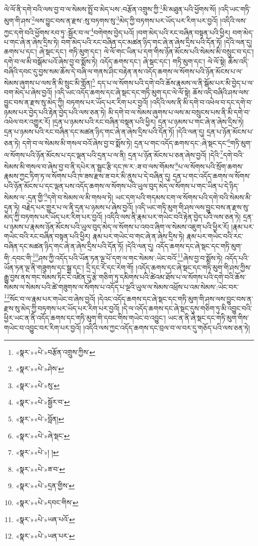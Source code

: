 ལེ་ལོ་ནི་དགེ་བའི་ལས་བྱ་བ་ལ་སེམས་སྤྲོ་བ་མེད་པས་:བརྩོན་འགྲུས་ཀྱི་\footnote{«སྣར་»«པེ་»བརྩོན་འགྲུས་ཀྱིས་}མི་མཐུན་པའི་ཕྱོགས་སོ། །འདི་ཡང་གཏི་མུག་གི་ཤས་\footnote{«སྣར་»«པེ་»ཤེས་}ལས་བྱུང་བས་ན་རྫས་:སུ་བཏགས་སུ་\footnote{«སྣར་»«པེ་»སུ་}མེད་ཀྱི་བཏགས་པར་ཡོད་པར་རིག་པར་བྱའོ། །འདིའི་ལས་ཀྱང་དགེ་བའི་ཕྱོགས་རབ་ཏུ་:སྦྱོར་བ་ལ་\footnote{«སྣར་»«པེ་»སྦྱོར་བ་}བགེགས་བྱེད་པའོ། །བག་མེད་པའི་རང་བཞིན་བསྟན་པའི་ཕྱིར། བག་མེད་པ་གང་ཞེ་ན་ཞེས་དྲིས་ཏེ། བག་མེད་པའི་རང་བཞིན་དང་མཚན་ཉིད་གང་ཞེ་ན་ཞེས་དྲིས་པའི་དོན་ཏོ། །དེའི་ལན་དུ། ཆགས་པ་དང་། ཞེ་སྡང་དང་། གཏི་མུག་དང་། ལེ་ལོ་གང་ཡིན་པ་དག་གིས་ཉོན་མོངས་པའི་སེམས་མི་བསྲུང་བ་དང་། དགེ་བ་ལ་མི་བསྒོམ་པའོ་ཞེས་བྱ་བ་སྨོས་ཏེ། འདོད་ཆགས་དང་། ཞེ་སྡང་དང་། གཏི་མུག་དང་། ལེ་ལོ་སྟེ། ཆོས་འདི་བཞིའི་དབང་དུ་བྱས་སམ་ཆོས་དེ་བཞི་ལ་གནས་ཤིང་བརྟེན་ནས་འདོད་ཆགས་ལ་སོགས་པའི་ཉོན་མོངས་པ་ལ་སེམས་ཞུགས་པ་ལས་ནི་མི་སྲུང་མི་གློན།\footnote{«སྣར་»«པེ་»བློན།} དད་པ་ལ་སོགས་པའི་དགེ་བའི་ཆོས་རྣམས་ལ་ནི་སྒོམ་པར་མི་བྱེད་པ་ལ་བག་མེད་པ་ཞེས་བྱའོ། །འདི་ཡང་འདོད་ཆགས་དང་ཞེ་སྡང་དང་གཏི་མུག་དང་ལེ་ལོ་སྟེ། ཆོས་འདི་བཞིའི་ཤས་ལས་བྱུང་བས་ན་རྫས་སུ་མེད་ཀྱི། བཏགས་པར་ཡོད་པར་རིག་པར་བྱའོ། །འདིའི་ལས་ནི་མི་དགེ་བ་འཕེལ་བ་དང་དགེ་བ་ཉམས་པར་བྱེད་པའི་རྟེན་བྱེད་པའི་ལས་ཅན་ཏེ། མི་དགེ་བ་ལ་སེམས་ཞུགས་པ་ལས་མ་བསྲུངས་པས་ནི་མི་དགེ་བ་འཕེལ་བར་འགྱུར་རོ། །དྲན་པ་ཉམས་པའི་རང་བཞིན་བསྟན་པའི་ཕྱིར། དྲན་པ་ཉམས་པ་གང་ཞེ་ན་ཞེས་དྲིས་ཏེ། དྲན་པ་ཉམས་པའི་རང་བཞིན་དང་མཚན་ཉིད་གང་ཞེ་ན་ཞེས་དྲིས་པའི་དོན་ཏོ། །དེའི་ལན་དུ། དྲན་པ་ཉོན་མོངས་པ་ཅན་ཏེ། དགེ་བ་ལ་སེམས་མི་གསལ་བའོ་ཞེས་བྱ་བ་སྨོས་ཏེ། དྲན་པ་གང་འདོད་ཆགས་དང་:ཞེ་སྡང་དང་\footnote{«སྣར་»«པེ་»ཞེ་སྡང་}གཏི་མུག་ལ་སོགས་པའི་ཉོན་མོངས་པ་དང་ལྡན་པའི་དྲན་པ་ལ་ནི། དྲན་པ་ཉོན་མོངས་པ་ཅན་ཞེས་བྱའོ། །དེའི་\footnote{«སྣར་»«པེ་»། །}དགེ་བའི་སེམས་མི་གསལ་བ་ཞེས་བྱ་བ་ནི་དཔེར་ན་སྦྲང་རྩི་དང་ཁ་ར་:ཟ་བ་ལས་གོམས་\footnote{«སྣར་»«པེ་»ཟ་བ་}པ་ལ་སོགས་པའི་སྲོག་ཆགས་རྣམས་ཀྱང་ཏིག་ཏ་ལ་སོགས་པའི་ཁ་ཟས་རྫས་ཟ་བར་མི་ནུས་པ་དེ་བཞིན་དུ། དྲན་པ་གང་འདོད་ཆགས་ལ་སོགས་པའི་ཉོན་མོངས་པ་དང་ལྡན་པས་འདོད་ཆགས་ལ་སོགས་པའི་ཡུལ་བུད་མེད་ལ་སོགས་པ་གང་ཡིན་པ་དེ་ཉིད་སེམས་ལ་:དྲན་གྱི་\footnote{«སྣར་»«པེ་»དྲན་གྱིས་}དགེ་བ་སེམས་ལ་མི་གསལ་ཏེ། ཡང་དག་པའི་གདམས་ངག་ལ་སོགས་པའི་དགེ་བའི་སེམས་མི་དྲན་ཏེ། བརྗེད་པར་གྱུར་པ་ལ་ནི་དྲན་པ་ཉམས་པ་ཞེས་བྱའོ། །འདི་ཡང་གཏི་མུག་གི་ཤས་ལས་བྱུང་བས་ན་རྫས་སུ་མེད་ཀྱི་བཏགས་པར་ཡོད་པར་རིག་པར་བྱའོ། །འདིའི་ལས་ནི་རྣམ་པར་གཡེང་བའི་རྟེན་བྱེད་པའི་ལས་ཅན་ཏེ། དྲན་པ་ཉམས་པ་རྣམས་ཉོན་མོངས་པའི་ཡུལ་བུད་མེད་ལ་སོགས་པ་འབའ་ཞིག་ལ་སེམས་འཇུག་པའི་ཕྱིར་རོ། །རྣམ་པར་གཡེང་བའི་རང་བཞིན་བསྟན་པའི་ཕྱིར། རྣམ་པར་གཡེང་བ་གང་ཞེ་ན་ཞེས་དྲིས་ཏེ། རྣམ་པར་གཡེང་བའི་རང་བཞིན་དང་མཚན་ཉིད་གང་ཞེ་ན་ཞེས་དྲིས་པའི་དོན་ཏོ། །དེའི་ལན་དུ། འདོད་ཆགས་དང་ཞེ་སྡང་དང་གཏི་མུག་གི་:དབང་གི་\footnote{«སྣར་»«པེ་»དབང་གིས་}ཤས་ཀྱི་འདོད་པའི་ཡོན་ཏན་ལྔ་པོ་དག་ལ་གང་སེམས་:ཡེང་བའོ་\footnote{«སྣར་»«པེ་»ཡན་པའོ་}ཞེས་བྱ་བ་སྨོས་ཏེ། འདོད་པའི་ཡོན་ཏན་ལྔ་ནི་གཟུགས་དང་སྒྲ་དང་། དྲི་དང་རོ་དང་རེག་གོ། །འདོད་ཆགས་དང་ཞེ་སྡང་དང་གཏི་མུག་གི་ཤས་ཀྱིས་རྒྱུ་བྱས་ནས་གང་སེམས་ཏིང་ངེ་འཛིན་དུ་རྩེ་གཅིག་ཏུ་དམིགས་པའི་ཚེའམ་ཐོས་པ་ལ་སོགས་པའི་དགེ་བའི་ཆོས་སེམས་ལ་སེམས་པའི་ཚེ་གཟུགས་ལ་སོགས་པ་འདོད་པ་ལྔའི་ཡུལ་ལ་སེམས་འཕྲོས་པ་འམ་སེམས་:ཡེང་བར་\footnote{«སྣར་»«པེ་»ཡན་པར་}སོང་བ་ལ་རྣམ་པར་གཡེང་བ་ཞེས་བྱའོ། །དེའང་འདོད་ཆགས་དང་ཞེ་སྡང་དང་གཏི་མུག་གི་ཤས་ལས་བྱུང་བས་ན་རྫས་སུ་མེད་ཀྱི་བཏགས་པར་ཡོད་པར་རིག་པར་བྱའོ། །དེ་ལ་འདོད་ཆགས་དང་ཞེ་སྡང་དུས་གཅིག་ཏུ་མི་འབྱུང་བའི་ཕྱིར་ཡང་ན་ནི་འདོད་ཆགས་དང་གཏི་མུག་གི་དབང་གིས་གཡེང་བ་འབྱུང་། ཡང་ན་ནི་ཞེ་སྡང་དང་གཏི་མུག་གིས་གཡེང་བ་འབྱུང་བར་རིག་པར་བྱའོ། །འདིའི་ལས་ཀྱང་འདོད་ཆགས་དང་བྲལ་བ་ལ་བར་དུ་གཅོད་པའི་ལས་ཅན་ཏེ། 